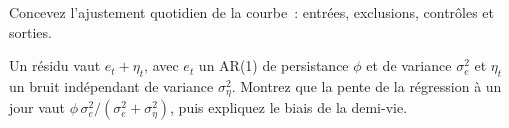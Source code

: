 \begin{interviewq}\label{iq:s2:government-bond-relative-value:5}
Concevez l'ajustement quotidien de la courbe~: entrées, exclusions, contrôles et sorties.
\end{interviewq}

\begin{interviewq}\label{iq:s2:government-bond-relative-value:6}
Un résidu vaut $e_t + \eta_t$, avec $e_t$ un AR(1) de persistance $\phi$ et de variance $\sigma_e^2$ et $\eta_t$ un bruit indépendant de variance
$\sigma_\eta^2$. Montrez que la pente de la régression à un jour vaut $\phi\,\sigma_e^2/(\sigma_e^2 + \sigma_\eta^2)$, puis expliquez le biais de la demi-vie.
\end{interviewq}
